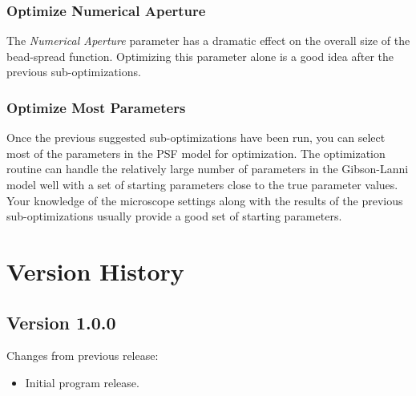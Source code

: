\documentclass[11pt,titlepage,twoside]{article}
\begin{document}
\subsubsection{Optimize Numerical Aperture}

The \emph{Numerical Aperture} parameter has a dramatic effect on the overall size of the bead-spread function. Optimizing this parameter alone is a good idea after the previous sub-optimizations.

\subsubsection{Optimize Most Parameters}

Once the previous suggested sub-optimizations have been run, you can select most of the parameters in the PSF model for optimization. The optimization routine can handle the relatively large number of parameters in the Gibson-Lanni model well with a set of starting parameters close to the true parameter values. Your knowledge of the microscope settings along with the results of the previous sub-optimizations usually provide a good set of starting parameters.

\section{Version History}

\subsection{Version 1.0.0}

\noindent
Changes from previous release:
\begin{itemize}
\item Initial program release.
\end{itemize}




\end{document}
